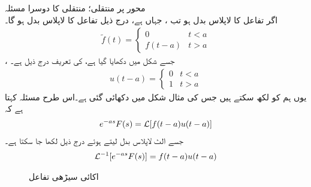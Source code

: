 \quad {} محور پر منتقلی؛ منتقلی کا دوسرا مسئلہ\\
اگر تفاعل  کا لاپلاس بدل  ہو تب ، جہاں  ہے، درج ذیل تفاعل کا لاپلاس بدل ہو گا۔
\begin{align*}
\tilde{f}(t)=
\begin{cases}
0& t<a\\
f(t-a) &  t>a
\end{cases}
\end{align*}
، جسے شکل  میں دکھایا گیا ہے، کی تعریف درج ذیل ہے۔
\begin{align}
u(t-a)=
\begin{cases}
0 & t<a\\
1& t>a
\end{cases}
\end{align}
یوں ہم  کو  لکھ سکتے ہیں جس کی مثال شکل  میں دکھائی گئی ہے۔اس طرح مسئلہ   کہتا ہے کہ
\begin{align}
e^{-as}F(s)=\mathcal{L}[f(t-a)u(t-a)]
\end{align}
جسے الٹ لاپلاس بدل لیتے ہوئے درج ذیل لکھا جا سکتا ہے۔
\begin{align}
\mathcal{L}^{-1}[e^{-as}F(s)]=f(t-a)u(t-a)
\end{align}
%
\begin{figure}
\centering
{}
\caption{اکائی سیڑھی تفاعل }
\label{شکل_لاپلاس_اکائی_سیڑھی_تفاعل}
\end{figure}
%
